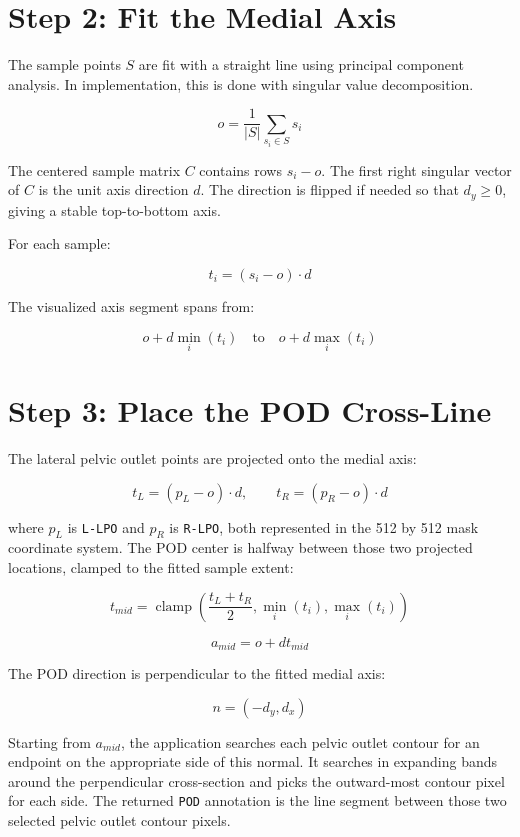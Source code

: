 \documentclass[11pt]{article}
\begin{document}
\section*{Step 2: Fit the Medial Axis}

The sample points \(S\) are fit with a straight line using principal component
analysis. In implementation, this is done with singular value decomposition.

\[
    o = \frac{1}{|S|}\sum_{s_i \in S} s_i
\]

The centered sample matrix \(C\) contains rows \(s_i - o\). The first right
singular vector of \(C\) is the unit axis direction \(d\). The direction is
flipped if needed so that \(d_y \ge 0\), giving a stable top-to-bottom axis.

For each sample:

\[
    t_i = (s_i - o) \cdot d
\]

The visualized axis segment spans from:

\[
    o + d\min_i(t_i)
    \quad \textrm{to} \quad
    o + d\max_i(t_i)
\]

\section*{Step 3: Place the POD Cross-Line}

The lateral pelvic outlet points are projected onto the medial axis:

\[
    t_L = (p_L - o)\cdot d,
    \qquad
    t_R = (p_R - o)\cdot d
\]

where \(p_L\) is \texttt{L-LPO} and \(p_R\) is \texttt{R-LPO}, both represented
in the 512 by 512 mask coordinate system. The POD center is halfway between
those two projected locations, clamped to the fitted sample extent:

\[
    t_{mid} =
    \operatorname{clamp}
    \left(
        \frac{t_L + t_R}{2},
        \min_i(t_i),
        \max_i(t_i)
    \right)
\]

\[
    a_{mid} = o + d t_{mid}
\]

The POD direction is perpendicular to the fitted medial axis:

\[
    n = (-d_y, d_x)
\]

Starting from \(a_{mid}\), the application searches each pelvic outlet contour
for an endpoint on the appropriate side of this normal. It searches in expanding
bands around the perpendicular cross-section and picks the outward-most contour
pixel for each side. The returned \texttt{POD} annotation is the line segment
between those two selected pelvic outlet contour pixels.
\end{document}
